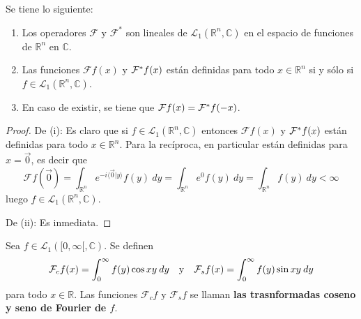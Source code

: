 \documentclass[12pt]{report}
\newcounter{it}
\theoremstyle{largebreak}
\newcommand\pint[2]{\ensuremath{\langle#1| #2\rangle}}
\newcommand{\fou}[1]{\ensuremath{\mathcal{F}#1}}
\begin{document}
    \renewcommand{\theenumi}{\roman{enumi}}

    \begin{obs}
        Se tiene lo siguiente:
        \begin{enumerate}
            \item Los operadores $\mathcal{F}$ y $\mathcal{F}^*$ son lineales de $\mathcal{L}_1(\mathbb{R}^n,\mathbb{C})$ en el espacio de funciones de $\mathbb{R}^n$ en $\mathbb{C}$.
            \item Las funciones $\fou{f}(x)$ y $\fou^*{f}(x)$ están definidas para todo $x\in\mathbb{R}^n$ si y sólo si $f\in\mathcal{L}_1(\mathbb{R}^n,\mathbb{C})$.
            \item En caso de existir, se tiene que $\fou{f}(x)=\fou^*{f}(-x)$.
        \end{enumerate}
    \end{obs}

    \begin{proof}
        De (i): Es claro que si $f\in\mathcal{L}_1(\mathbb{R}^n,\mathbb{C})$ entonces $\fou{f}(x)$ y $\fou^*{f}(x)$ están definidas para todo $x\in\mathbb{R}^n$. Para la recíproca, en particular están definidas para $x=\vec{0}$, es decir que
        \begin{equation*}
            \fou{f}\left(\vec{0}\right)=\int_{\mathbb{R}^n}e^{ -i\pint{\vec{0}}{y}}f(y)\:dy=\int_{\mathbb{R}^n}e^{0}f(y)\:dy=\int_{\mathbb{R}^n}f(y)\:dy<\infty
        \end{equation*}
        luego $f\in\mathcal{L}_1(\mathbb{R}^n,\mathbb{C})$.

        De (ii): Es inmediata.
    \end{proof}

    \begin{mydef}
        Sea $f\in\mathcal{L}_1([0,\infty[,\mathbb{C})$. Se definen
        \begin{equation*}
            \mathcal{F}_cf(x)=\int_0^\infty f(y)\cos xy\:dy\quad\textup{y}\quad\mathcal{F}_sf(x)=\int_0^\infty f(y)\sin xy\:dy
        \end{equation*}
        para todo $x\in\mathbb{R}$. Las funciones $\mathcal{F}_cf$ y  $\mathcal{F}_sf$ se llaman \textbf{las trasnformadas coseno y seno de Fourier de $f$}.
    \end{mydef}
\end{document}
